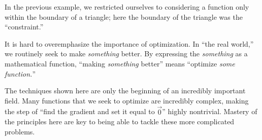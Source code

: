 \documentclass{ximera}
\begin{document}
In the previous example, we restricted ourselves
to considering a function only within the boundary of a triangle; here
the boundary of the triangle was the ``constraint.''




      
It is hard to overemphasize the importance of optimization. In ``the
real world,'' we routinely seek to make \textit{something} better. By
expressing the \textit{something} as a mathematical function, ``making
\textit{something} better'' means ``optimize \textit{some function.}''
      
The techniques shown here are only the beginning of an incredibly
important field. Many functions that we seek to optimize are
incredibly complex, making the step of ``find the gradient and set it
equal to $\vec 0$'' highly nontrivial. Mastery of the principles here
are key to being able to tackle these more complicated problems.
\end{document}
